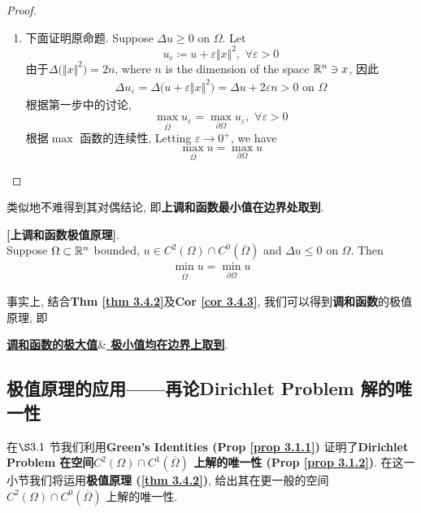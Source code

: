 \begin{thm}
\begin{proof}
\begin{enumerate}
				\item 下面证明原命题. Suppose $\Delta u \geq 0$ on $\Omega$. Let 
				\[ u_{\varepsilon} \coloneqq u + \varepsilon \Vert x \Vert^2 , \,\, \forall \varepsilon > 0 \]
				由于$\Delta \Big( \Vert x \Vert^2 \Big) = 2n$, where $n$ is the dimension of the space $\mathbb{R}^n \ni x$, 因此
				\begin{align*}
					\Delta u_\varepsilon = \Delta \Big( u + \varepsilon \Vert x \Vert^2 \Big) 
					= \Delta u + 2 \varepsilon n > 0 \,\, \text{on} \,\, \Omega
				\end{align*}
				根据第一步中的讨论, 
				\[ \max_{\overline{\Omega}} u_\varepsilon = \max_{\partial \Omega} u_\varepsilon , \,\, \forall \varepsilon > 0 \]
				根据$\max$ 函数的连续性, Letting $\varepsilon \to 0^+$, we have
				\[ \max_{\overline{\Omega}} u = \max_{\partial \Omega} u \]
			\end{enumerate}
		\end{proof}
	
		\newpage		
	\end{thm}
	
	
	类似地不难得到其对偶结论, 即\textbf{上调和函数最小值在边界处取到}. 
	
	\vspace{1em}
	
	\begin{corollary}\label{cor 3.4.3}
		\textbf{[上调和函数极值原理]}. \\
		Suppose $\Omega \subset \mathbb{R}^n$ bounded, $u \in C^2(\Omega) \cap C^0 \left( \overline{\Omega} \right)$ and $\Delta u \leq 0$ on $\Omega$. Then
		\begin{align*}
			\min_{\overline{\Omega}} u = \min_{\partial \Omega} u
		\end{align*}
		
		\vspace{2em}
		
		\begin{rmk}
			事实上, 结合\textbf{Thm \ref{thm 3.4.2}}及\textbf{Cor \ref{cor 3.4.3}}, 我们可以得到\textbf{调和函数}的极值原理, 即
			\begin{center}
				\underline{\textbf{调和函数的极大值$\&$ 极小值均在边界上取到}}. 
			\end{center}
		\end{rmk}
	\end{corollary}

\newpage

\subsection{极值原理的应用——再论Dirichlet Problem 解的唯一性}
	在$\S 3.1$ 节我们利用\textbf{Green's Identities (Prop \ref{prop 3.1.1})} 证明了\textbf{Dirichlet Problem 在空间$C^2(\Omega) \cap C^1\left( \overline{\Omega} \right)$ 上解的唯一性 (Prop \ref{prop 3.1.2})}. 在这一小节我们将运用\textbf{极值原理 (\ref{thm 3.4.2})}, 给出其在更一般的空间$C^2(\Omega) \cap C^0\left( \overline{\Omega} \right)$ 上解的唯一性. 
	
